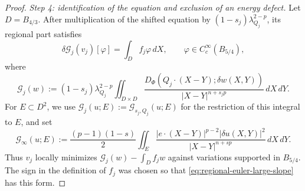 \documentclass[11pt,reqno]{amsart}
\numberwithin{equation}{section}
\newcommand{\dd}{\,d}
\theoremstyle{remark}
\begin{document}
\begin{proof}
\emph{Step 4: identification of the equation and exclusion of an energy
defect.}
Let \(D=B_{4/3}\).  After multiplication of the shifted equation by
\((1-s_j)\lambda_{Q_j}^{2-p}\), its regional part satisfies
\begin{equation}
 \delta\mathscr G_j(v_j)[\varphi]=\int_Df_j\varphi\dd X,
 \qquad \varphi\in C_c^\infty(B_{5/4}),
 \label{eq:regional-euler-large-slope}
\end{equation}
where
\begin{equation*}
 \mathscr G_j(w):=(1-s_j)\lambda_{Q_j}^{2-p}
 \iint_{D\times D}
 \frac{D_\Phi(Q_j\cdot(X-Y);\delta w(X,Y))}
 {|X-Y|^{n+s_jp}}\dd X\!\dd Y.
\end{equation*}
For \(E\subset D^2\), we use
\(\mathscr G_j(u;E):=\mathscr G_{s_j,Q_j}(u;E)\) for the restriction
of this integral to \(E\), and set
\[
 \mathscr G_\infty(u;E):=
 \frac{(p-1)(1-s)}2
 \iint_E\frac{|e\cdot(X-Y)|^{p-2}|\delta u(X,Y)|^2}
 {|X-Y|^{n+sp}}\dd X\!\dd Y.
\]
Thus \(v_j\) locally minimizes
\(\mathscr G_j(w)-\int_Df_jw\) against variations supported in
\(B_{5/4}\).  The sign in the definition of \(f_j\) was chosen so that
\eqref{eq:regional-euler-large-slope} has this form.


\end{proof}
\end{document}
